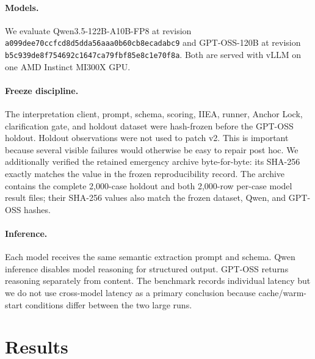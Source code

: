 \paragraph{Models.}
We evaluate Qwen3.5-122B-A10B-FP8 \cite{qwen35} at revision \texttt{a099dee70ccfcd8d5dda56aaa0b60cb8ecadabc9} and GPT-OSS-120B \cite{gptoss120b} at revision \texttt{b5c939de8f754692c1647ca79fbf85e8c1e70f8a}. Both are served with vLLM on one AMD Instinct MI300X GPU.

\paragraph{Freeze discipline.}
The interpretation client, prompt, schema, scoring, IIEA, runner, Anchor Lock, clarification gate, and holdout dataset were hash-frozen before the GPT-OSS holdout. Holdout observations were not used to patch v2. This is important because several visible failures would otherwise be easy to repair post hoc. We additionally verified the retained emergency archive byte-for-byte: its SHA-256 exactly matches the value in the frozen reproducibility record. The archive contains the complete 2,000-case holdout and both 2,000-row per-case model result files; their SHA-256 values also match the frozen dataset, Qwen, and GPT-OSS hashes.

\paragraph{Inference.}
Each model receives the same semantic extraction prompt and schema. Qwen inference disables model reasoning for structured output. GPT-OSS returns reasoning separately from content. The benchmark records individual latency but we do not use cross-model latency as a primary conclusion because cache/warm-start conditions differ between the two large runs.

\section{Results}

